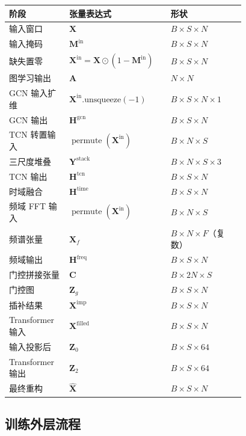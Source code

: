 \documentclass[UTF8]{ctexart}
\begin{document}
\begin{longtable}{>{\raggedright\arraybackslash}p{0.22\linewidth} >{\raggedright\arraybackslash}p{0.28\linewidth} >{\raggedright\arraybackslash}p{0.28\linewidth}}
\toprule
阶段 & 张量表达式 & 形状 \\
\midrule
\endhead
输入窗口 & $\bm{X}$ & $B \times S \times N$ \\
输入掩码 & $\bm{M}^{\text{in}}$ & $B \times S \times N$ \\
缺失置零 & $\bm{X}^{\text{in}} = \bm{X}\odot(1-\bm{M}^{\text{in}})$ & $B \times S \times N$ \\
图学习输出 & $\bm{A}$ & $N \times N$ \\
GCN 输入扩维 & $\bm{X}^{\text{in}}.\text{unsqueeze}(-1)$ & $B \times S \times N \times 1$ \\
GCN 输出 & $\bm{H}^{\text{gcn}}$ & $B \times S \times N$ \\
TCN 转置输入 & $\operatorname{permute}(\bm{X}^{\text{in}})$ & $B \times N \times S$ \\
三尺度堆叠 & $\bm{Y}^{\text{stack}}$ & $B \times N \times S \times 3$ \\
TCN 输出 & $\bm{H}^{\text{tcn}}$ & $B \times S \times N$ \\
时域融合 & $\bm{H}^{\text{time}}$ & $B \times S \times N$ \\
频域 FFT 输入 & $\operatorname{permute}(\bm{X}^{\text{in}})$ & $B \times N \times S$ \\
频谱张量 & $\bm{X}_f$ & $B \times N \times F$（复数） \\
频域输出 & $\bm{H}^{\text{freq}}$ & $B \times S \times N$ \\
门控拼接张量 & $\bm{C}$ & $B \times 2N \times S$ \\
门控图 & $\bm{Z}_g$ & $B \times S \times N$ \\
插补结果 & $\bm{X}^{\text{imp}}$ & $B \times S \times N$ \\
Transformer 输入 & $\bm{X}^{\text{filled}}$ & $B \times S \times N$ \\
输入投影后 & $\bm{Z}_0$ & $B \times S \times 64$ \\
Transformer 输出 & $\bm{Z}_2$ & $B \times S \times 64$ \\
最终重构 & $\hat{\bm{X}}$ & $B \times S \times N$ \\
\bottomrule
\end{longtable}

\subsection{训练外层流程}
\end{document}
